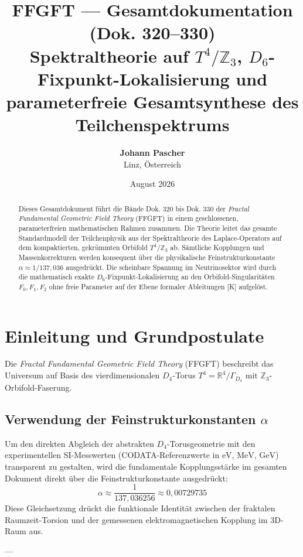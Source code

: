 \documentclass[11pt,a4paper]{article}
\title{\textbf{FFGFT — Gesamtdokumentation (Dok. 320--330)}\\
	\large Spektraltheorie auf $T^4/\mathbb{Z}_3$, $D_6$-Fixpunkt-Lokalisierung und parameterfreie Gesamtsynthese des Teilchenspektrums}
\author{\textbf{Johann Pascher} \\ Linz, Österreich}
\date{August 2026}
\begin{document}
	
	\maketitle
	
	\begin{abstract}
		Dieses Gesamtdokument führt die Bände Dok. 320 bis Dok. 330 der \emph{Fractal Fundamental Geometric Field Theory} (FFGFT) in einem geschlossenen, parameterfreien mathematischen Rahmen zusammen. Die Theorie leitet das gesamte Standardmodell der Teilchenphysik aus der Spektraltheorie des Laplace-Operators auf dem kompaktierten, gekrümmten Orbifold $T^4/\mathbb{Z}_3$ ab. Sämtliche Kopplungen und Massenkorrekturen werden konsequent über die physikalische Feinstrukturkonstante $\alpha \approx 1/137{,}036$ ausgedrückt. Die scheinbare Spannung im Neutrinosektor wird durch die mathematisch exakte $D_6$-Fixpunkt-Lokalisierung an den Orbifold-Singularitäten $F_0, F_1, F_2$ ohne freie Parameter auf der Ebene formaler Ableitungen [K] aufgelöst.
	\end{abstract}
	
	\tableofcontents
	\newpage
	
	\section{Einleitung und Grundpostulate}
	
	Die \emph{Fractal Fundamental Geometric Field Theory} (FFGFT) beschreibt das Universum auf Basis des vierdimensionalen $D_4$-Torus $T^4 = \mathbb{R}^4/\Gamma_{D_4}$ mit $\mathbb{Z}_3$-Orbifold-Faserung.
	
	\subsection{Verwendung der Feinstrukturkonstanten \texorpdfstring{$\alpha$}{alpha}}
	Um den direkten Abgleich der abstrakten $D_4$-Torusgeometrie mit den experimentellen SI-Messwerten (CODATA-Referenzwerte in $\text{eV}$, $\text{MeV}$, $\text{GeV}$) transparent zu gestalten, wird die fundamentale Kopplungsstärke im gesamten Dokument direkt über die Feinstrukturkonstante ausgedrückt:
	\begin{equation}
		\alpha \approx \frac{1}{137{,}036256} \approx 0{,}00729735
	\end{equation}
	Diese Gleichsetzung drückt die funktionale Identität zwischen der fraktalen Raumzeit-Torsion und der gemessenen elektromagnetischen Kopplung im 3D-Raum aus.
	
	---
	
\end{document}
